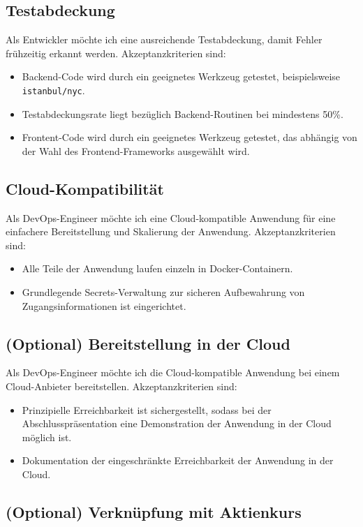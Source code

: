 \documentclass[a4paper, 10pt, conference]{IEEEtran}
\begin{document}
\subsection{Testabdeckung}

Als Entwickler möchte ich eine ausreichende Testabdeckung, damit Fehler frühzeitig erkannt werden.  Akzeptanzkriterien sind:
\begin{itemize}
\item Backend-Code wird durch ein geeignetes Werkzeug getestet, beispielsweise \texttt{istanbul/nyc}.
\item Testabdeckungsrate liegt bezüglich Backend-Routinen bei mindestens 50\%.
\item Frontent-Code wird durch ein geeignetes Werkzeug getestet, das abhängig von der Wahl des Frontend-Frameworks ausgewählt wird.
\end{itemize}

\subsection{Cloud-Kompatibilität}

Als DevOps-Engineer möchte ich eine Cloud-kompatible Anwendung für eine einfachere Bereitstellung und Skalierung der Anwendung. Akzeptanzkriterien sind:
\begin{itemize}
\item Alle Teile der Anwendung laufen einzeln in Docker-Containern.
\item Grundlegende Secrets-Verwaltung zur sicheren Aufbewahrung von Zugangsinformationen ist eingerichtet.
\end{itemize}

\subsection{(Optional) Bereitstellung in der Cloud}

Als DevOps-Engineer möchte ich die Cloud-kompatible Anwendung bei einem Cloud-Anbieter bereitstellen.  Akzeptanzkriterien sind:
\begin{itemize}
\item Prinzipielle Erreichbarkeit ist sichergestellt, sodass bei der Abschlusspräsentation eine Demonstration der Anwendung in der Cloud möglich ist.
\item Dokumentation der eingeschränkte Erreichbarkeit der Anwendung in der Cloud.
\end{itemize}

\subsection{(Optional) Verknüpfung mit Aktienkurs}
\end{document}
